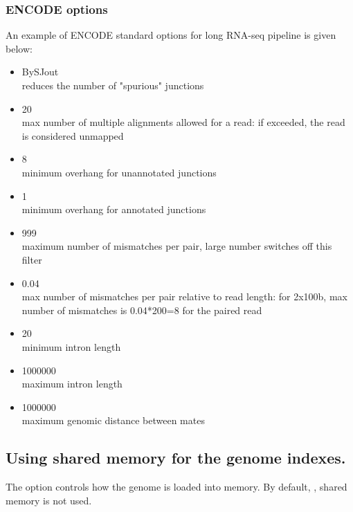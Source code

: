 \documentclass[12pt]{article}
\begin{document}
\subsubsection{ENCODE options}
An example of ENCODE standard options for long RNA-seq pipeline is given below:
\begin{itemize}
\item[]
              BySJout\\
reduces the number of "spurious" junctions
\item[] 
      20\\
max number of multiple alignments allowed for a read: if exceeded, the read is considered unmapped
\item[]
         8\\
minimum overhang for unannotated junctions
\item[]
       1\\
minimum overhang for annotated junctions
\item[]
      999\\
maximum number of mismatches per pair, large number switches off this filter
\item[]
 0.04\\
max number of mismatches per pair relative to read length: for 2x100b, max number of mismatches is 0.04*200=8 for the paired read
\item[]
             20\\
minimum intron length
\item[]
             1000000\\
maximum intron length
\item[]
           1000000\\
maximum genomic distance between mates
\end{itemize}

\subsection{Using shared memory for the genome indexes.}
The  option controls how the genome is loaded into memory. By default,  , shared memory is not used. 
\end{document}
